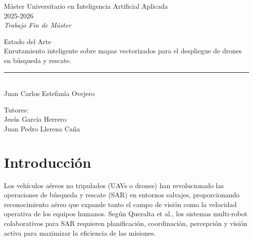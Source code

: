 \documentclass[12pt]{report} %
\begin{document}

\begin{titlepage}
	\begin{sffamily}
	\color{azulUC3M}
	\begin{center}
		\begin{Large}
			Máster Universitario en Inteligencia Artificial Aplicada\\			
			 2025-2026\\
			\vspace{2cm}		
			\textsl{Trabajo Fin de Máster}
			\bigskip
			
		\end{Large}
		 	{\Huge Estado del Arte}\\
		 	\vspace*{0.3cm}
		 	{\Large Enrutamiento inteligente sobre mapas vectorizados para el despliegue de drones en búsqueda y rescate.}\\
		 	\vspace*{0.5cm}
	 		\rule{10.5cm}{0.1mm}\\
			\vspace*{0.9cm}
			{\LARGE Juan Carlos Estefanía Ovejero}\\ 
			\vspace*{1cm}
		\begin{Large}
			Tutores:\\
			Jesús García Herrero\\
			Juan Pedro Llerena Caña\\
		\end{Large}
	\end{center}
	\vfill
	\end{sffamily}
\end{titlepage}

\newpage
\thispagestyle{empty}
\mbox{}


\tableofcontents
\thispagestyle{fancy}

\newpage
\thispagestyle{empty}
\mbox{}

\clearpage
{}

\chapter{Introducción}

Los vehículos aéreos no tripulados (UAVs o drones) han revolucionado las operaciones de búsqueda y rescate (SAR) en entornos salvajes, proporcionando reconocimiento aéreo que expande tanto el campo de visión como la velocidad operativa de los equipos humanos. Según Queralta et al.\cite{queralta2020}, los sistemas multi-robot colaborativos para SAR requieren planificación, coordinación, percepción y visión activa para maximizar la eficiencia de las misiones.
\end{document}
